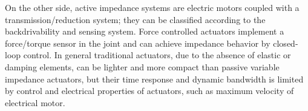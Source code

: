 \par On the other side, active impedance systems are electric motors coupled with a transmission/reduction system; they can be classified
according to the backdrivability and sensing system. Force controlled actuators implement a force/torque sensor
in the joint and can achieve impedance behavior by closed-loop control.
In general traditional actuators, due to the absence of elastic or damping elements, can be lighter and more compact
than passive variable impedance actuators, but their time response and dynamic bandwidth is limited by control and electrical properties of actuators, such as maximum velocity of electrical motor.
%
%
%
%
